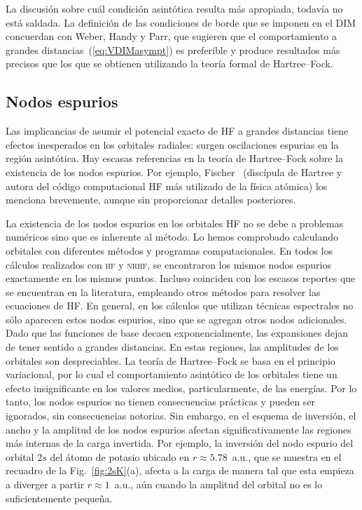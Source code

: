 La discusión sobre cuál condición asintótica resulta más apropiada, 
todavía no está saldada. La definición de las condiciones de borde que 
se imponen en el DIM concuerdan con Weber, Handy y Parr, que sugieren 
que el comportamiento a grandes distancias~(\ref{eq:VDIMasympt}) es 
preferible y produce resultados más precisos que los que se obtienen 
utilizando la teoría formal de Hartree--Fock. 

\subsection{Nodos espurios}
\label{subsec:espuriosHF}

Las implicancias de asumir el potencial exacto de HF a grandes 
distancias tiene efectos inesperados en los orbitales radiales: surgen
oscilaciones espurias en la región asintótica. Hay escasas referencias 
en la teoría de Hartree--Fock sobre la existencia de los nodos espurios. 
Por ejemplo, Fischer~\cite{FroeseFischer:97} (discípula de Hartree y 
autora del código computacional HF más utilizado de la física atómica) 
los menciona brevemente, aunque sin proporcionar detalles posteriores. 

La existencia de los nodos espurios en los orbitales HF no se debe a 
problemas numéricos sino que es inherente al método. Lo hemos 
comprobado calculando orbitales con diferentes métodos y programas 
computacionales. En todos los cálculos realizados con \textsc{hf} y 
\textsc{nrhf}, se encontraron los mismos nodos espurios exactamente en 
los mismos puntos. Incluso coinciden con los escasos reportes que se 
encuentran en la literatura, empleando otros métodos para resolver las 
ecuaciones de HF. En general, en los cálculos que utilizan técnicas 
espectrales no sólo aparecen estos nodos espurios, sino que se agregan 
otros nodos adicionales. Dado que las funciones de base decaen 
exponencialmente, las expansiones dejan de tener sentido a grandes 
distancias. En estas regiones, las amplitudes de los 
orbitales son despreciables. La teoría de Hartree--Fock se basa en el 
principio variacional, por lo cual el comportamiento asintótico de los 
orbitales tiene un efecto insignificante en los valores medios, 
particularmente, de las energías. Por lo tanto, los nodos espurios no 
tienen consecuencias prácticas y pueden ser ignorados, sin consecuencias 
notorias. Sin embargo, en el esquema de inversión, el ancho y la 
amplitud de 
los nodos espurios afectan significativamente las regiones más internas 
de la carga invertida. Por ejemplo, la inversión del nodo espurio del 
orbital $2s$ del átomo de potasio ubicado en $r\approx 5.78$~a.u., que 
se muestra en el recuadro de la Fig.~\ref{fig:2sK}(a), afecta a la carga 
de manera tal que esta empieza a diverger a partir $r\approx 1$~a.u., 
aún cuando la amplitud del orbital no es lo suficientemente pequeña. 

